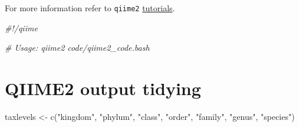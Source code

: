 \documentclass[
  12pt,
  openany]{book}
\newenvironment{Shaded}{\begin{snugshade}}{\end{snugshade}}
\newcommand{\CommentTok}[1]{\textcolor[rgb]{0.56,0.35,0.01}{\textit{#1}}}
\newcommand{\FunctionTok}[1]{\textcolor[rgb]{0.00,0.00,0.00}{#1}}
\newcommand{\NormalTok}[1]{#1}
\newcommand{\OtherTok}[1]{\textcolor[rgb]{0.56,0.35,0.01}{#1}}
\newcommand{\StringTok}[1]{\textcolor[rgb]{0.31,0.60,0.02}{#1}}
\begin{document}
For more information refer to \texttt{qiime2} \href{https://docs.qiime2.org/2022.2/tutorials/}{tutorials}.

\begin{Shaded}
\begin{Highlighting}[]
\CommentTok{\#!/qiime}

\CommentTok{\# Usage: qiime2 code/qiime2\_code.bash}
\end{Highlighting}
\end{Shaded}

\hypertarget{qiime2-output-tidying}{%
\section{QIIME2 output tidying}\label{qiime2-output-tidying}}

\begin{Shaded}
\begin{Highlighting}[]
\NormalTok{taxlevels }\OtherTok{\textless{}{-}} \FunctionTok{c}\NormalTok{(}\StringTok{"kingdom"}\NormalTok{, }\StringTok{"phylum"}\NormalTok{, }\StringTok{"class"}\NormalTok{, }\StringTok{"order"}\NormalTok{, }\StringTok{"family"}\NormalTok{, }\StringTok{"genus"}\NormalTok{, }\StringTok{"species"}\NormalTok{)}


\end{Highlighting}
\end{Shaded}
\end{document}
